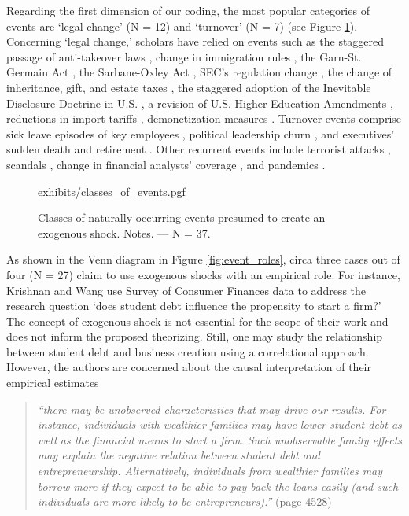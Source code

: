 \documentclass[11pt]{article}
\begin{document}
\begin{refsection}
Regarding the first dimension of our coding, the most popular categories of events are `legal change' (N = 12) and `turnover' (N = 7) (see Figure  \ref{fig:classes_of_events}). Concerning `legal change,' scholars have relied on events such as the staggered passage of anti-takeover laws  \autocite{cabral202128,wang20162393}, change in immigration rules  \autocite{choudhury2019203}, the Garn-St. Germain Act \autocite{haveman2001253}, the Sarbane-Oxley Act \autocite{gupta2020802}, SEC's regulation change \autocite{jia2020290}, the change of inheritance, gift, and estate taxes \autocite{kang20201300}, the staggered adoption of the Inevitable Disclosure Doctrine in U.S. \autocite{kang20201300}, a revision of U.S. Higher Education Amendments \autocite{krishnan20194522}, reductions in import tariffs \autocite{li20194011}, demonetization measures \autocite{natarajan20191070}. Turnover events comprise sick leave episodes of key employees \autocite{chen20181239,drexler20142722,chown2015177,}, political leadership churn \autocite{birhanu2020,byun20191368}, and executives' sudden death  \autocite{ke2019439,he20221512} and retirement \autocite{he20221512}. Other recurrent events include terrorist attacks \autocite{corbo2016323,vergne20121027,li20194011,bastardoz2022}, scandals \autocite{cai2019159,hilary2021}, change in financial analysts' coverage \autocite{chatterji2010917,qian20192271}, and pandemics  \autocite{garretsen2022,jo20211267}.

\begin{figure}[!htbp]
    \centering
    {exhibits/classes_of_events.pgf}
    \caption{Classes of naturally occurring events presumed to create an
    exogenous shock. Notes. --- N = 37.}
    \label{fig:classes_of_events}
\end{figure}

As shown in the Venn diagram in Figure \ref{fig:event_roles}, circa three cases out of four (N = 27) claim to use exogenous shocks with an empirical role. For instance, Krishnan and Wang \autocite*{krishnan20194522} use Survey of Consumer Finances data to address the research question `does student debt influence the propensity to start a firm?'  The concept of exogenous shock is not essential for the scope of their work and does not inform the proposed theorizing. Still, one may study the relationship between student debt and business creation using a correlational approach. However, the authors are concerned about the causal interpretation of their empirical estimates

\begin{quote}
  \textit{
  ``there may be unobserved characteristics that may drive our results. For
  instance, individuals with wealthier families may have lower student debt as
  well as the financial means to start a firm. Such unobservable family effects
  may explain the negative relation between student debt and entrepreneurship.
  Alternatively, individuals from wealthier families may borrow more if they
  expect to be able to pay back the loans easily (and such individuals are more
  likely to be entrepreneurs).''
  }
  (page 4528)
\end{quote}


\end{refsection}
\end{document}
